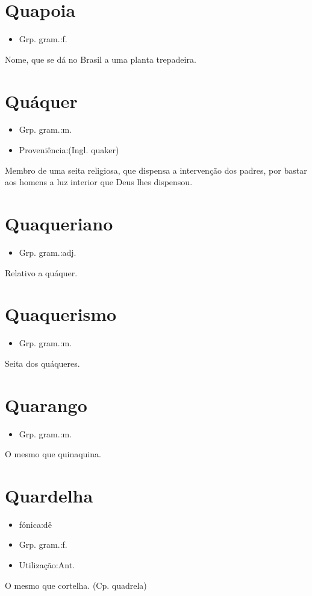 \section{Quapoia}
\begin{itemize}
\item {Grp. gram.:f.}
\end{itemize}
Nome, que se dá no Brasil a uma planta trepadeira.
\section{Quáquer}
\begin{itemize}
\item {Grp. gram.:m.}
\end{itemize}
\begin{itemize}
\item {Proveniência:(Ingl. \textunderscore quaker\textunderscore )}
\end{itemize}
Membro de uma seita religiosa, que dispensa a intervenção dos padres, por bastar aos homens a luz interior que Deus lhes dispensou.
\section{Quaqueriano}
\begin{itemize}
\item {Grp. gram.:adj.}
\end{itemize}
Relativo a quáquer.
\section{Quaquerismo}
\begin{itemize}
\item {Grp. gram.:m.}
\end{itemize}
Seita dos quáqueres.
\section{Quarango}
\begin{itemize}
\item {Grp. gram.:m.}
\end{itemize}
O mesmo que \textunderscore quinaquina\textunderscore .
\section{Quardelha}
\begin{itemize}
\item {fónica:dê}
\end{itemize}
\begin{itemize}
\item {Grp. gram.:f.}
\end{itemize}
\begin{itemize}
\item {Utilização:Ant.}
\end{itemize}
O mesmo que \textunderscore cortelha\textunderscore .
(Cp. \textunderscore quadrela\textunderscore )
